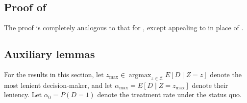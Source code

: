 \documentclass[12pt]{article}%
\theoremstyle{definition}
\DeclareMathOperator*{\argmax}{argmax}
\newcommand\1{\operatorname{I}\indicatorfence}
\begin{document}
\begin{appendices}
\subsection{Proof of \texorpdfstring{}{Corollary~\ref{cor:optmize_over_pi2}}}
The proof is completely analogous to that for , except appealing to  in place of .

\subsection{Auxiliary lemmas}\label{sec:auxiliary-lemmas}
For the results in this section, let
$z_{\max}\in\argmax_{z\in\mathcal{Z}} E[D\mid Z=z]$ denote the most lenient
decision-maker, and let $\alpha_{\max}=E[D\mid Z=z_{\max}]$ denote their
leniency. Let $\alpha_{0}=P(D=1)$ denote the treatment rate under the status
quo.


\end{appendices}
\end{document}
